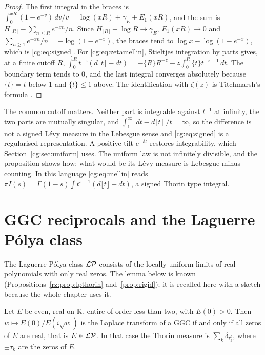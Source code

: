 \begin{proof}
The first integral in the braces is $\int_0^{xR}(1-e^{-v})\,dv/v=\log(xR)+\gamma_E+E_1(xR)$, and the sum is $H_{\lfloor R\rfloor}-\sum_{n\le R}e^{-xn}/n$. Since $H_{\lfloor R\rfloor}-\log R\to\gamma_E$, $E_1(xR)\to0$ and $\sum_{n\ge1}e^{-xn}/n=-\log(1-e^{-x})$, the braces tend to $\log x-\log(1-e^{-x})$, which is \eqref{cg:eq:signed}. For \eqref{cg:eq:zetamellin}, Stieltjes integration by parts gives, at a finite cutoff $R$, $\int_0^Rt^{-z}(d\lfloor t\rfloor-dt)=-\{R\}R^{-z}-z\int_0^R\{t\}t^{-z-1}\,dt$. The boundary term tends to $0$, and the last integral converges absolutely because $\{t\}=t$ below $1$ and $\{t\}\le1$ above. The identification with $\zeta(z)$ is Titchmarsh's formula \cite[Equation 2.1.5]{Titchmarsh}.
\end{proof}

The common cutoff matters. Neither part is integrable against $t^{-1}$ at infinity, the two parts are mutually singular, and $\int_1^\infty|dt-d\lfloor t\rfloor|/t=\infty$, so the difference is not a signed L\'evy measure in the Lebesgue sense and \eqref{cg:eq:signed} is a regularised representation. A positive tilt $e^{-\delta t}$ restores integrability, which Section~\ref{cg:sec:uniform} uses. The uniform law is not infinitely divisible, and the proposition shows how: what would be its L\'evy measure is Lebesgue minus counting. In this language \eqref{cg:eq:mellin} reads $\pi I(s)=\Gamma(1-s)\int t^{s-1}(d\lfloor t\rfloor-dt)$, a signed Thorin type integral.

\section{GGC reciprocals and the Laguerre P\'olya class}\label{cg:sec:lp}

The Laguerre P\'olya class $\mathcal{L}\mathcal{P}$ consists of the locally uniform limits of real polynomials with only real zeros. The lemma below is known (Propositions~\ref{rz:prop:lpthorin} and~\ref{prop:rigid}); it is recalled here with a sketch because the whole chapter uses it.

\begin{lemma}\label{cg:lem:lpggc}
Let $E$ be even, real on $\mathbb{R}$, entire of order less than two, with $E(0)>0$. Then $w\mapsto E(0)/E(i\sqrt w)$ is the Laplace transform of a GGC if and only if all zeros of $E$ are real, that is $E\in\mathcal{L}\mathcal{P}$. In that case the Thorin measure is $\sum_k\delta_{\tau_k^2}$, where $\pm\tau_k$ are the zeros of $E$.
\end{lemma}

